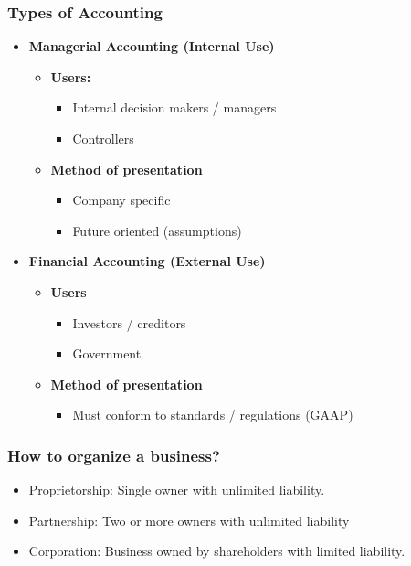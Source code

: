 \subsubsection{Types of Accounting}
\begin{definition}
    \begin{itemize}
        \item \textbf{Managerial Accounting (Internal Use)}
        \begin{itemize}
            \item \textbf{Users:}
            \begin{itemize}
                \item Internal decision makers / managers
                \item Controllers
            \end{itemize}
            \item \textbf{Method of presentation}
            \begin{itemize}
                \item Company specific
                \item Future oriented (assumptions)
            \end{itemize}
        \end{itemize}
    
        \item \textbf{Financial Accounting (External Use)}
        \begin{itemize}
            \item \textbf{Users}
            \begin{itemize}
                \item Investors / creditors
                \item Government
            \end{itemize}
            \item \textbf{Method of presentation}
            \begin{itemize}
                \item Must conform to standards / regulations (GAAP)
            \end{itemize}
        \end{itemize}
    \end{itemize}    
\end{definition}

\subsubsection{How to organize a business?}
\begin{definition}
    \begin{itemize}
        \item Proprietorship: Single owner with unlimited liability.
        \item Partnership: Two or more owners with unlimited liability
        \item Corporation: Business owned by shareholders with limited liability. 
    \end{itemize}
\end{definition}

